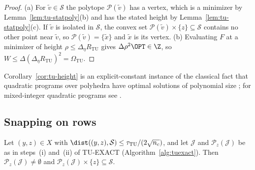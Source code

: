 \begin{proof}
(a) For $\tilde v\in\mathcal S$ the polytope $\mathcal P(\tilde v)$ has a
vertex, which is a minimizer by Lemma~\ref{lem:tu-statpoly}(b) and has the
stated height by Lemma~\ref{lem:tu-statpoly}(c). If $\tilde v$ is isolated in
$\mathcal S$, the convex set $\mathcal P(\tilde v)\times\{z\}\subseteq\mathcal S$
contains no other point near $\tilde v$, so $\mathcal P(\tilde v)=\{\tilde x\}$
and $\tilde x$ is its vertex.
(b) Evaluating $F$ at a minimizer of height $\rho\le\Delta_\eta R_{\mathrm{TU}}$
gives $\Delta\rho^2\OPT\in\Z$, so $W\le\Delta(\Delta_\eta R_{\mathrm{TU}})^2=\Omega_{\mathrm{TU}}$.
\end{proof}

Corollary~\ref{cor:tu-height} is an explicit-constant instance of the
classical fact that quadratic programs over polyhedra have optimal solutions
of polynomial size \cite{Vavasis1990}; for mixed-integer quadratic programs see
\cite{DelPiaDeyMolinaro2017}.

\subsection{Snapping on rows}\label{app:tu-snap}

\begin{lemma}\label{lem:tu-snap}
Let $(y,z)\in X$ with $\dist((y,z),\mathcal S)\le\tau_{\mathrm{TU}}/(2\sqrt{n_c})$,
and let $\mathcal J$ and $\mathcal P_z(\mathcal J)$ be as in steps~(i)
and~(ii) of TU-EXACT (Algorithm~\ref{alg:tuexact}). Then $\mathcal P_z(\mathcal J)\ne\emptyset$ and
$\mathcal P_z(\mathcal J)\times\{z\}\subseteq\mathcal S$.
\end{lemma}

